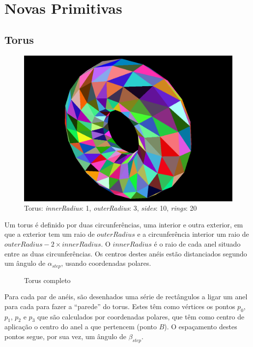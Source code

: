 \documentclass[a4paper]{article}
\newcommand{\x}{\times}
\begin{document}
\section{Novas Primitivas}

\subsection{Torus}

\begin{figure}[H]
    \includegraphics[width=\textwidth]{torus.png}
    \caption{Torus: \textit{innerRadius}: 1, \textit{outerRadius}: 3, \textit{sides}: 10, \textit{rings}: 20}
\end{figure}

Um torus é definido por duas circunferências, uma interior e outra exterior, em
que a exterior tem um raio de $outerRadius$ e a circunferência interior um raio
de $outerRadius - 2 \x innerRadius$.
O $innerRadius$ é o raio de cada anel situado entre as duas circunferências. Os
centros destes anéis estão distanciados segundo um ângulo de $\alpha_{step}$,
usando coordenadas polares.

\begin{figure}[H]
    \centering
    \caption{Torus completo}
\end{figure}

Para cada par de anéis, são desenhados uma série de rectângulos a ligar um anel para cada para fazer a ``parede'' do torus. Estes têm como vértices os pontos $p_0$, $p_1$, $p_2$ e $p_3$ que são calculados por coordenadas polares, que têm como centro de aplicação o centro do anel a que pertencem (ponto $B$). O espaçamento destes pontos segue, por sua vez, um ângulo de $\beta_{step}$.
\end{document}
